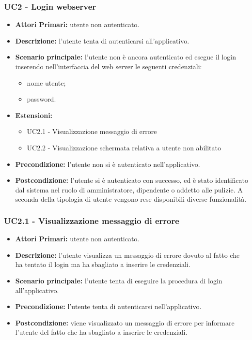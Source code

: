 \subsubsection{ UC2 - Login webserver}
\begin{itemize}
           	\item\textbf{Attori Primari:} utente non autenticato.
           	\item\textbf{Descrizione:} l’utente tenta di autenticarsi all'applicativo.
           	\item\textbf{Scenario principale:} l’utente non è ancora autenticato ed esegue il login inserendo nell'interfaccia del web server le seguenti credenziali:
           	\begin{itemize}
           		\item nome utente;
           		\item password.
           	\end{itemize}
           	\item\textbf{Estensioni:}
           	\begin{itemize}
           		\item UC2.1 - Visualizzazione messaggio di errore
           		\item UC2.2 - Visualizzazione schermata relativa a utente non abilitato
           	\end{itemize}
           	\item\textbf{Precondizione:} l’utente non si è autenticato nell'applicativo. 
           	\item\textbf{Postcondizione:} l’utente si è autenticato con successo, ed è stato identificato dal sistema nel ruolo di amministratore, dipendente o addetto alle pulizie. A seconda della tipologia di utente vengono rese
           	disponibili diverse funzionalità.
\end{itemize}

\subsubsection{ UC2.1 - Visualizzazione messaggio di errore}
\begin{itemize}
	\item\textbf{Attori Primari:} utente non autenticato.
	\item\textbf{Descrizione:} l'utente visualizza un messaggio di errore dovuto al fatto che ha tentato il login ma ha sbagliato a inserire le credenziali.
	\item\textbf{Scenario principale:} l’utente tenta di eseguire la procedura di login all'applicativo.
	\item\textbf{Precondizione:} l'utente tenta di autenticarsi nell'applicativo.
	\item\textbf{Postcondizione:} viene visualizzato un messaggio di errore per informare l'utente del fatto che ha sbagliato a inserire le credenziali.
\end{itemize}
